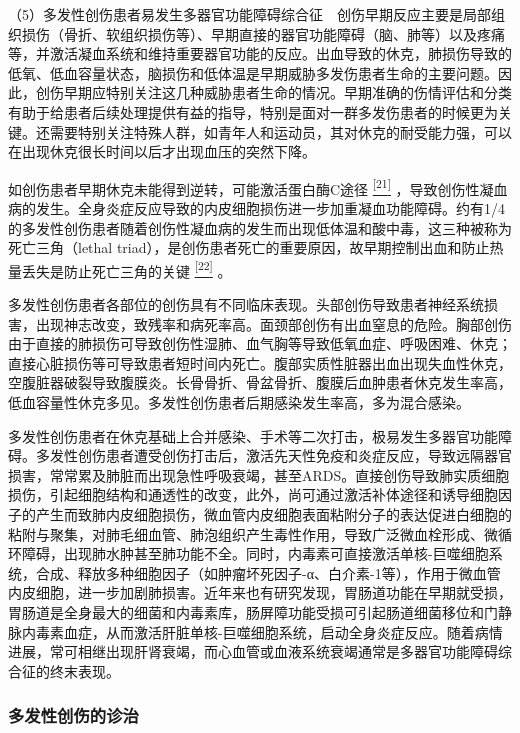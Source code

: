 （5）多发性创伤患者易发生多器官功能障碍综合征　创伤早期反应主要是局部组织损伤（骨折、软组织损伤等）、早期直接的器官功能障碍（脑、肺等）以及疼痛等，并激活凝血系统和维持重要器官功能的反应。出血导致的休克，肺损伤导致的低氧、低血容量状态，脑损伤和低体温是早期威胁多发伤患者生命的主要问题。因此，创伤早期应特别关注这几种威胁患者生命的情况。早期准确的伤情评估和分类有助于给患者后续处理提供有益的指导，特别是面对一群多发伤患者的时候更为关键。还需要特别关注特殊人群，如青年人和运动员，其对休克的耐受能力强，可以在出现休克很长时间以后才出现血压的突然下降。

如创伤患者早期休克未能得到逆转，可能激活蛋白酶C途径
\protect\hyperlink{text00024.htmlux5cux23ch21-23}{\textsuperscript{{[}21{]}}}
，导致创伤性凝血病的发生。全身炎症反应导致的内皮细胞损伤进一步加重凝血功能障碍。约有1/4的多发性创伤患者随着创伤性凝血病的发生而出现低体温和酸中毒，这三种被称为死亡三角（lethal
triad），是创伤患者死亡的重要原因，故早期控制出血和防止热量丢失是防止死亡三角的关键
\protect\hyperlink{text00024.htmlux5cux23ch22-23}{\textsuperscript{{[}22{]}}}
。

多发性创伤患者各部位的创伤具有不同临床表现。头部创伤导致患者神经系统损害，出现神志改变，致残率和病死率高。面颈部创伤有出血窒息的危险。胸部创伤由于直接的肺损伤可导致创伤性湿肺、血气胸等导致低氧血症、呼吸困难、休克；直接心脏损伤等可导致患者短时间内死亡。腹部实质性脏器出血出现失血性休克，空腹脏器破裂导致腹膜炎。长骨骨折、骨盆骨折、腹膜后血肿患者休克发生率高，低血容量性休克多见。多发性创伤患者后期感染发生率高，多为混合感染。

多发性创伤患者在休克基础上合并感染、手术等二次打击，极易发生多器官功能障碍。多发性创伤患者遭受创伤打击后，激活先天性免疫和炎症反应，导致远隔器官损害，常常累及肺脏而出现急性呼吸衰竭，甚至ARDS。直接创伤导致肺实质细胞损伤，引起细胞结构和通透性的改变，此外，尚可通过激活补体途径和诱导细胞因子的产生而致肺内皮细胞损伤，微血管内皮细胞表面粘附分子的表达促进白细胞的粘附与聚集，对肺毛细血管、肺泡组织产生毒性作用，导致广泛微血栓形成、微循环障碍，出现肺水肿甚至肺功能不全。同时，内毒素可直接激活单核-巨噬细胞系统，合成、释放多种细胞因子（如肿瘤坏死因子-α、白介素-1等），作用于微血管内皮细胞，进一步加剧肺损害。近年来也有研究发现，胃肠道功能在早期就受损，胃肠道是全身最大的细菌和内毒素库，肠屏障功能受损可引起肠道细菌移位和门静脉内毒素血症，从而激活肝脏单核-巨噬细胞系统，启动全身炎症反应。随着病情进展，常可相继出现肝肾衰竭，而心血管或血液系统衰竭通常是多器官功能障碍综合征的终末表现。

\subsubsection{多发性创伤的诊治}

